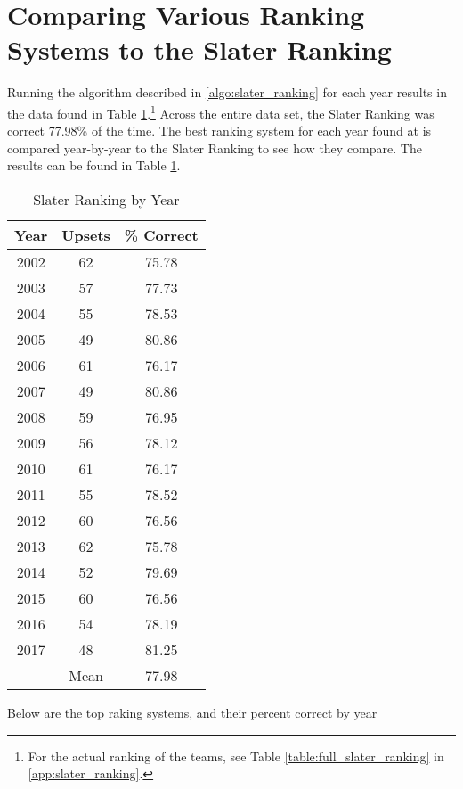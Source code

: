 \documentclass[11pt]{article}
\begin{document}
\section{Comparing Various Ranking Systems to the Slater Ranking}

Running the algorithm described in \ref{algo:slater_ranking} for each year results in the data found in Table \ref{table:slater_ranking_year}.\footnote{For the actual ranking of the teams, see Table \ref{table:full_slater_ranking} in \ref{app:slater_ranking}.} Across the entire data set, the Slater Ranking was correct 77.98\% of the time. The best ranking system for each year found at \cite{} is compared year-by-year to the Slater Ranking to see how they compare. The results can be found in Table \ref{}.

\begin{table}[!htb]
\begin{center}
\scriptsize
\begin{tabular}{|c|c|c|}
\hline
Year & Upsets & \% Correct\\
\hline
2002 & 62 & 75.78\\
2003 & 57 & 77.73\\
2004 & 55 & 78.53\\
2005 & 49 & 80.86\\
2006 & 61 & 76.17\\
2007 & 49 & 80.86\\
2008 & 59 & 76.95\\
2009 & 56 & 78.12\\
2010 & 61 & 76.17\\
2011 & 55 & 78.52\\
2012 & 60 & 76.56\\
2013 & 62 & 75.78\\
2014 & 52 & 79.69\\
2015 & 60 & 76.56\\
2016 & 54 & 78.19\\
2017 & 48 & 81.25\\
\hline
 & Mean & 77.98\\
\hline
\end{tabular}
\caption{Slater Ranking by Year}\label{table:slater_ranking_year}
\end{center}
\end{table}


Below are the top raking systems, and their percent correct by year

%
% 
\end{document}
